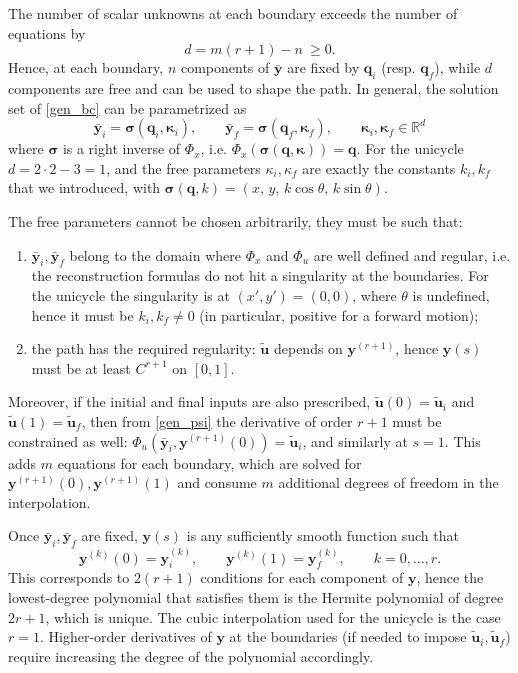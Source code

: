 \documentclass[10pt, a4paper]{report}
\newcommand{\y}{{\mathbf y}}
\newcommand{\q}{{\mathbf q}}
\begin{document}
The number of scalar unknowns at each boundary exceeds the number of equations by\begin{equation}
    d=m(r+1)-n\ \ge 0.
\end{equation}
Hence, at each boundary, $n$ components of $\bar{\y}$ are fixed by $\q_i$ (resp. $\q_f$), while $d$ components are free and can be used to shape the path. In general, the solution set of \eqref{gen_bc} can be parametrized as\begin{equation}
    \bar{\y}_i=\boldsymbol{\sigma}(\q_i,\boldsymbol{\kappa}_i),\qquad \bar{\y}_f=\boldsymbol{\sigma}(\q_f,\boldsymbol{\kappa}_f),\qquad \boldsymbol{\kappa}_i,\boldsymbol{\kappa}_f\in\mathbb{R}^d
\end{equation}
where $\boldsymbol{\sigma}$ is a right inverse of $\Phi_x$, i.e. $\Phi_x(\boldsymbol{\sigma}(\q,\boldsymbol{\kappa}))=\q$. For the unicycle $d=2\cdot 2-3=1$, and the free parameters $\kappa_i,\kappa_f$ are exactly the constants $k_i,k_f$ that we introduced, with $\boldsymbol{\sigma}(\q,k)=(x,\,y,\,k\cos\theta,\,k\sin\theta)$.\bigskip

\noindent The free parameters cannot be chosen arbitrarily, they must be such that:\begin{enumerate}
    \item $\bar{\y}_i,\bar{\y}_f$ belong to the domain where $\Phi_x$ and $\Phi_u$ are well defined and regular, i.e. the reconstruction formulas do not hit a singularity at the boundaries. For the unicycle the singularity is at $(x',y')=(0,0)$, where $\theta$ is undefined, hence it must be $k_i,k_f\neq 0$ (in particular, positive for a forward motion);
    \item the path has the required regularity: $\tilde{\mathbf u}$ depends on $\y^{(r+1)}$, hence $\y(s)$ must be at least $C^{r+1}$ on $[0,1]$.
\end{enumerate}
Moreover, if the initial and final inputs are also prescribed, $\tilde{\mathbf u}(0)=\tilde{\mathbf u}_i$ and $\tilde{\mathbf u}(1)=\tilde{\mathbf u}_f$, then from \eqref{gen_psi} the derivative of order $r+1$ must be constrained as well: $\Phi_u(\bar{\y}_i,\y^{(r+1)}(0))=\tilde{\mathbf u}_i$, and similarly at $s=1$. This adds $m$ equations for each boundary, which are solved for $\y^{(r+1)}(0),\y^{(r+1)}(1)$ and consume $m$ additional degrees of freedom in the interpolation.\bigskip


\noindent Once $\bar{\y}_i,\bar{\y}_f$ are fixed, $\y(s)$ is any sufficiently smooth function such that\begin{equation}
    \y^{(k)}(0)=\y_i^{(k)},\qquad \y^{(k)}(1)=\y_f^{(k)},\qquad k=0,\dots,r.
\end{equation}
This corresponds to $2(r+1)$ conditions for each component of $\y$, hence the lowest-degree polynomial that satisfies them is the Hermite polynomial of degree $2r+1$, which is unique. The cubic interpolation used for the unicycle is the case $r=1$. Higher-order derivatives of $\y$ at the boundaries (if needed to impose $\tilde{\mathbf u}_i,\tilde{\mathbf u}_f$) require increasing the degree of the polynomial accordingly.
\end{document}
